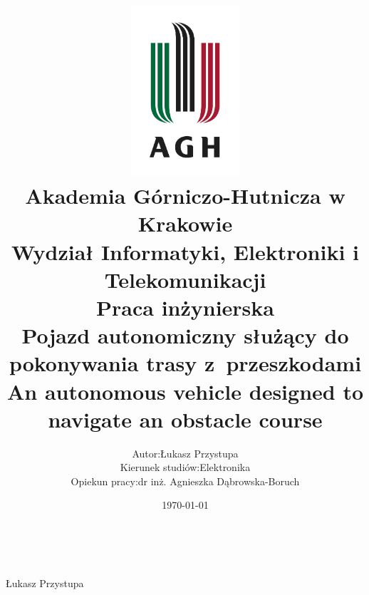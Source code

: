 \documentclass[12pt]{article}
\title{
    \includegraphics[width = 0.3\textwidth]{agh_logo.jpg}\\
    \textbf{Akademia Górniczo-Hutnicza w Krakowie}\\
    Wydział Informatyki, Elektroniki i  Telekomunikacji\\\vspace{2cm}
    \textbf{Praca inżynierska}\\
    Pojazd autonomiczny służący do pokonywania trasy z~przeszkodami\\\vspace{1cm}
    \small{An autonomous vehicle designed to navigate an obstacle course}
}
\author{
    \begin{tabularx}{\textwidth}{l l}
    Autor: &Łukasz Przystupa\\
    Kierunek studiów: & Elektronika\\
    Opiekun pracy: &dr inż. Agnieszka Dąbrowska-Boruch
    \end{tabularx}
}
\date{\vspace{2cm}\today}
\numberwithin{equation}{section}
\begin{document}
    \begin{titlepage}
        \maketitle
        \thispagestyle{empty}
        \newpage
        \
        \thispagestyle{empty}
    \end{titlepage}

        
        \tableofcontents
        \newpage
    
    
    
    
    
    
    
\newpage
    

    \vfill
    \begin{flushright}
        Łukasz Przystupa
    \end{flushright}

    \newpage
    \nocite{*}
    \printbibliography

    \listoffigures
    \listoftables
\end{document}
